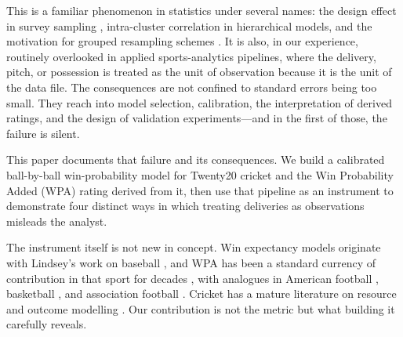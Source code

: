 \documentclass[conference]{IEEEtran}
\begin{document}
This is a familiar phenomenon in statistics under several names: the
design effect in survey sampling \cite{kish1965}, intra-cluster
correlation in hierarchical models, and the motivation for grouped
resampling schemes \cite{field2007}. It is also, in our experience,
routinely overlooked in applied sports-analytics pipelines, where the
delivery, pitch, or possession is treated as the unit of observation
because it is the unit of the data file. The consequences are not
confined to standard errors being too small. They reach into model
selection, calibration, the interpretation of derived ratings, and the
design of validation experiments---and in the first of those, the
failure is silent.

This paper documents that failure and its consequences. We build a
calibrated ball-by-ball win-probability model for Twenty20 cricket and
the Win Probability Added (WPA) rating derived from it, then use that
pipeline as an instrument to demonstrate four distinct ways in which
treating deliveries as observations misleads the analyst.

The instrument itself is not new in concept. Win expectancy models
originate with Lindsey's work on baseball \cite{lindsey1963}, and WPA
has been a standard currency of contribution in that sport for decades
\cite{tango2007}, with analogues in American football \cite{yurko2019},
basketball \cite{cervone2016}, and association football
\cite{decroos2019}. Cricket has a mature literature on resource and
outcome modelling \cite{dl1998, stern2016, bailey2006}. Our
contribution is not the metric but what building it carefully reveals.
\end{document}
